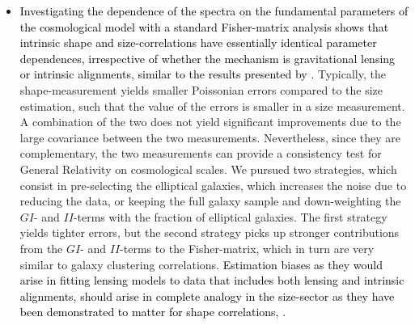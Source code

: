 \documentclass[a4paper,fleqn,usenatbib]{mnras}
\newcommand\spirou[1]{\textcolor{black}{#1}}
\begin{document}
\begin{itemize}
\item{\spirou{Investigating the dependence of the spectra on the fundamental parameters of the cosmological model with a standard Fisher-matrix analysis shows that intrinsic shape and size-correlations have essentially identical parameter dependences, irrespective of whether the mechanism is gravitational lensing or intrinsic alignments, similar to the results presented by \citet{alsing_weak_2014}.} Typically, the shape-measurement yields smaller Poissonian errors compared to the size estimation, such that the value of the errors is smaller in a size measurement. A combination of the two does not yield significant improvements due to the large covariance between the two measurements. Nevertheless, since they are complementary, the two measurements can provide a consistency test for General Relativity on cosmological scales. We pursued two strategies, which consist in pre-selecting the elliptical galaxies, which increases the noise due to reducing the data, or keeping the full galaxy sample and down-weighting the $GI$- and $II$-terms with the fraction of elliptical galaxies. The first strategy yields tighter errors, but  the second strategy picks up stronger contributions from the $GI$- and $II$-terms to the Fisher-matrix, which in turn are very similar to galaxy clustering correlations. \spirou{Estimation biases as they would arise in fitting lensing models to data that includes both lensing and intrinsic alignments, should arise in complete analogy in the size-sector as they have been demonstrated to matter for shape correlations, \citep{joachimi_simultaneous_2010, kirk_galaxy_2015, joachimi_galaxy_2015, krause_impact_2016}.}}

\end{itemize}
\end{document}
